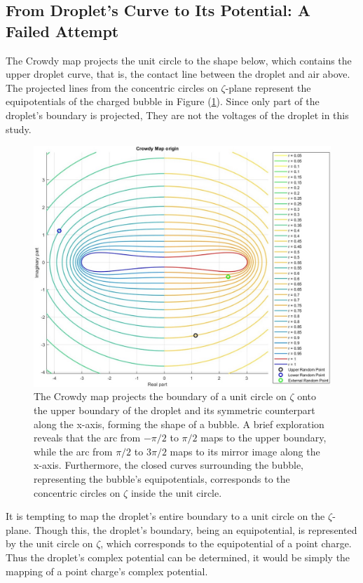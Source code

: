\subsection{From Droplet's Curve to Its Potential: A Failed Attempt}
\hspace{0em}\indent The Crowdy map projects the unit circle to the shape below, which contains the upper droplet curve, that is, the contact line between the droplet and air above. The projected lines from the concentric circles on $\zeta$-plane represent the equipotentials of the charged bubble in Figure (\ref{fig:bubble_pot}). Since only part of the droplet's boundary is projected, They are not the voltages of the droplet in this study.
\begin{figure}[H]
    \centering
    \includegraphics[width=1\linewidth]{Figs/crowdy 1-1.jpg}
    \caption{\small The Crowdy map projects the boundary of a unit circle on $\zeta$ onto the upper boundary of the droplet and its symmetric counterpart along the x-axis, forming the shape of a bubble. A brief exploration reveals that the arc from $-\pi/2$ to $\pi/2$ maps to the upper boundary, while the arc from $\pi/2$ to $3\pi/2$ maps to its mirror image along the x-axis. Furthermore, the closed curves surrounding the bubble, representing the bubble's equipotentials, corresponds to the concentric circles on $\zeta$ inside the unit circle.}
    \label{fig:bubble_pot}
\end{figure}
It is tempting to map the droplet's entire boundary to a unit circle on the $\zeta$-plane. Though this, the droplet's boundary, being an equipotential, is represented by the unit circle on $\zeta$, which corresponds to the equipotential of a point charge. Thus the droplet's complex potential can be determined, it would be simply the mapping of a point charge's complex potential.

